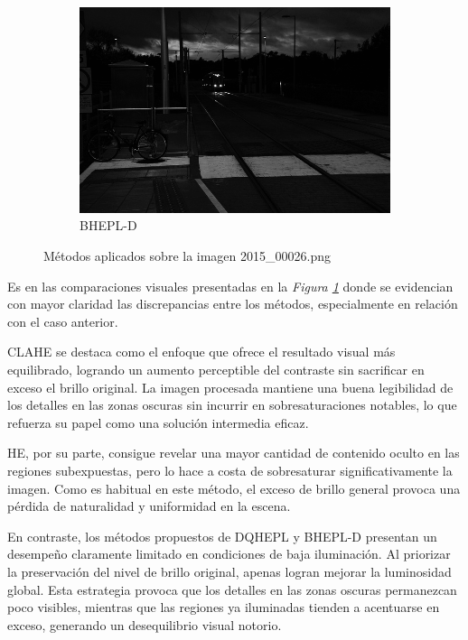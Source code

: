 \documentclass[sigchi]{acmart}
\begin{document}
\begin{figure}[htbp]
	\begin{subfigure}[b]{0.32\textwidth}
		\centering
		\includegraphics[width=\linewidth]{./procesadas/2015_00026/2015_00026_bhepl_d.png}
		\caption{BHEPL-D}
	\end{subfigure}

	\caption{Métodos aplicados sobre la imagen 2015\_00026.png}
	\label{fig:visual_026}
\end{figure}

Es en las comparaciones visuales presentadas en la \emph{Figura \ref{fig:visual_026}} donde se
evidencian con mayor claridad las discrepancias entre los métodos, especialmente en relación
con el caso anterior.

CLAHE se destaca como el enfoque que ofrece el resultado visual más equilibrado, logrando un
aumento perceptible del contraste sin sacrificar en exceso el brillo original. La imagen
procesada mantiene una buena legibilidad de los detalles en las zonas oscuras sin incurrir en
sobresaturaciones notables, lo que refuerza su papel como una solución intermedia eficaz.

HE, por su parte, consigue revelar una mayor cantidad de contenido oculto en las regiones
subexpuestas, pero lo hace a costa de sobresaturar significativamente la imagen. Como es
habitual en este método, el exceso de brillo general provoca una pérdida de naturalidad y
uniformidad en la escena.

En contraste, los métodos propuestos de DQHEPL y BHEPL-D presentan un desempeño claramente
limitado en condiciones de baja iluminación. Al priorizar la preservación del nivel de brillo
original, apenas logran mejorar la luminosidad global. Esta estrategia provoca que los detalles
en las zonas oscuras permanezcan poco visibles, mientras que las regiones ya iluminadas tienden
a acentuarse en exceso, generando un desequilibrio visual notorio.
\end{document}
